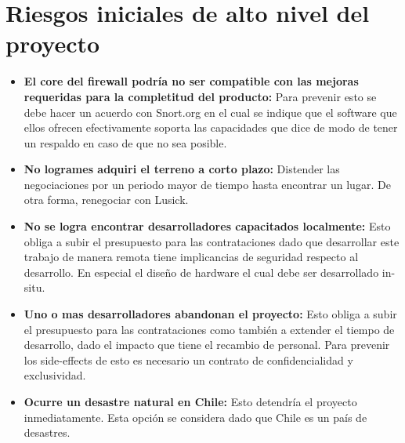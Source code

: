 \documentclass[11pt]{utalcaDoc}
\begin{document}
\section{Riesgos iniciales de alto nivel del proyecto}{
  \begin{itemize}
    \item{ \textbf{El core del firewall podría no ser compatible con las mejoras requeridas para la completitud del producto:}
    Para prevenir esto se debe hacer un acuerdo con Snort.org en el cual se indique que el software que ellos ofrecen efectivamente soporta las capacidades que dice de modo de tener un respaldo en caso de que no sea posible. }
    \item{ \textbf{No logrames adquiri el terreno a corto plazo:}
    Distender las negociaciones por un periodo mayor de tiempo hasta encontrar un lugar. De otra forma, renegociar con Lusick. }
    \item{ \textbf{No se logra encontrar desarrolladores capacitados localmente:}
    Esto obliga a subir el presupuesto para las contrataciones dado que desarrollar este trabajo de manera remota tiene implicancias de seguridad respecto al desarrollo. En especial el diseño de hardware el cual debe ser desarrollado in-situ. }
    \item{ \textbf{Uno o mas desarrolladores abandonan el proyecto:}
    Esto obliga a subir el presupuesto para las contrataciones como también a extender el tiempo de desarrollo, dado el impacto que tiene el recambio de personal. Para prevenir los side-effects de esto es necesario un contrato de confidencialidad y exclusividad. }
    \item{ \textbf{Ocurre un desastre natural en Chile:}
    Esto detendría el proyecto inmediatamente. Esta opción se considera dado que Chile es un país de desastres. }
  \end{itemize}
}
\end{document}

